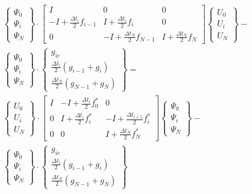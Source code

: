 \documentclass[10pt]{article}
\begin{document}
\begin{eqnarray}
\left\{\begin{array}{c} \Psi_0 \\ \Psi_i \\\Psi_N \end{array}\right\}
\cdot
\left[ \begin{array}{ccc} 
I & 0 & 0 \\
-I + \frac{\Delta t_i}{2} f_{i-1} & I + \frac{\Delta t_i}{2} f_i & 0 \\
0 & -I + \frac{\Delta t_N}{2} f_{N-1} & I + \frac{\Delta t_N}{2} f_N
\end{array} \right] 
\left\{\begin{array}{c} U_0 \\ U_i \\ U_N \end{array} \right\} - \nonumber\\
\left\{\begin{array}{c} \Psi_0 \\ \Psi_i \\\Psi_N \end{array}\right\}
\cdot
\left\{\begin{array}{c} g_{ic} \\ \frac{\Delta t_i}{2}(g_{i-1} + g_i) \\ 
\frac{\Delta t_N}{2}(g_{N-1} + g_N)\end{array} \right\} = \\
\left\{\begin{array}{c} U_0 \\ U_i \\ U_N \end{array}\right\}
\cdot
\left[ \begin{array}{ccc} 
I & -I + \frac{\Delta t_i}{2} f^*_{0} & 0 \\
0 & I + \frac{\Delta t_i}{2} f^*_i & -I + \frac{\Delta t_{i+1}}{2} f^*_{i} \\
0 &  0 & I + \frac{\Delta t_N}{2} f^*_N
\end{array} \right] 
\left\{\begin{array}{c} \Psi_0 \\ \Psi_i \\ \Psi_N \end{array} \right\} - 
\nonumber\\
\left\{\begin{array}{c} \Psi_0 \\ \Psi_i \\\Psi_N \end{array}\right\}
\cdot
\left\{\begin{array}{c} g_{ic} \\ \frac{\Delta t_i}{2}(g_{i-1} + g_i) \\ 
\frac{\Delta t_N}{2}(g_{N-1} + g_N)\end{array} \right\} 
\end{eqnarray}
\end{document}
